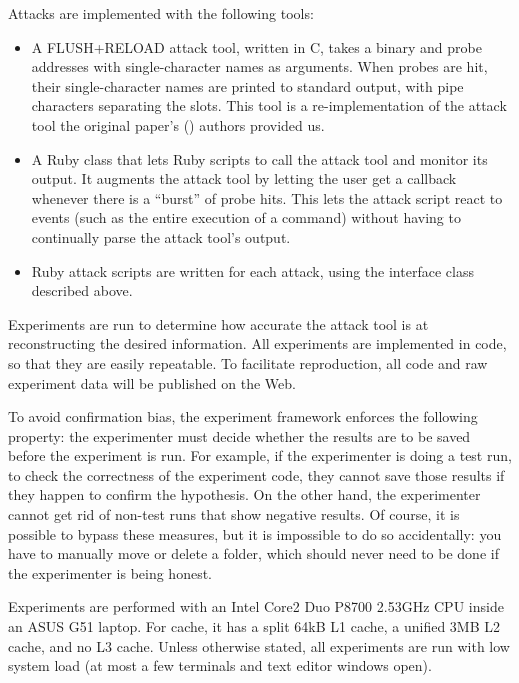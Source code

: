 \documentclass{acm_proc_article-sp}
\begin{document}
Attacks are implemented with the following tools:

\begin{itemize}
    \item A FLUSH+RELOAD attack tool, written in C, takes a binary and probe
        addresses with single-character names as arguments. When probes are hit,
        their single-character names are printed to standard output, with pipe
        characters separating the slots. This tool is a re-implementation of the
        attack tool the original paper's (\cite{yarom2013flush}) authors
        provided us.

    \item A Ruby class that lets Ruby scripts to call the attack tool and
        monitor its output. It augments the attack tool by letting the user get
        a callback whenever there is a ``burst'' of probe hits. This lets the
        attack script react to events (such as the entire execution of
        a command) without having to continually parse the attack tool's output.

    \item Ruby attack scripts are written for each attack, using the interface
        class described above.
\end{itemize}

Experiments are run to determine how accurate the attack tool is at
reconstructing the desired information. All experiments are implemented in code,
so that they are easily repeatable. To facilitate reproduction, all code and raw
experiment data will be published on the Web. 

To avoid confirmation bias, the experiment framework enforces the following
property: the experimenter must decide whether the results are to be saved
before the experiment is run. For example, if the experimenter is doing a test
run, to check the correctness of the experiment code, they cannot save those
results if they happen to confirm the hypothesis. On the other hand, the
experimenter cannot get rid of non-test runs that show negative results. Of
course, it is possible to bypass these measures, but it is impossible to do so
accidentally: you have to manually move or delete a folder, which should never
need to be done if the experimenter is being honest.

Experiments are performed with an Intel Core2 Duo P8700 2.53GHz CPU inside an
ASUS G51 laptop. For cache, it has a split 64kB L1 cache, a unified 3MB L2
cache, and no L3 cache. Unless otherwise stated, all experiments are run with
low system load (at most a few terminals and text editor windows open).
\end{document}
